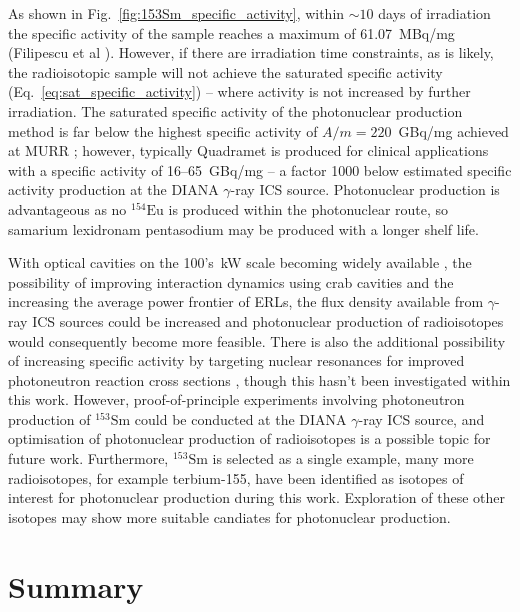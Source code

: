 \documentclass[../main.tex]{subfiles}
\begin{document}
As shown in Fig.~\ref{fig:153Sm_specific_activity}, within $\sim 10$ days of irradiation the specific activity of the sample reaches a maximum of 61.07~\si{\mega\becquerel}/\si{\milli\gram} (Filipescu et al \cite{filipescu2014photoneutron}). However, if there are irradiation time constraints, as is likely, the radioisotopic sample will not achieve the saturated specific activity (Eq.~\ref{eq:sat_specific_activity}) -- where activity is not increased by further irradiation. The saturated specific activity of the photonuclear production method is far below the highest specific activity of $A/m=220$~\si{\giga\becquerel}/\si{\milli\gram} achieved at MURR \cite{ma1996production}; however, typically Quadramet is produced for clinical applications with a specific activity of 16--65~\si{\giga\becquerel}/\si{\milli\gram} \cite{ema2015quadramet} -- a factor 1000 below estimated specific activity production at the DIANA $\gamma$-ray ICS source. Photonuclear production is advantageous as no $^{154}\mathrm{Eu}$ is produced within the photonuclear route, so samarium lexidronam pentasodium may be produced with a longer shelf life.
 
With optical cavities on the 100's~\si{\kilo\watt} scale becoming widely available \cite{eggl2016munich,liu2018optical}, the possibility of improving interaction dynamics using crab cavities \cite{variola2011luminosity,koshiba2018luminosity} and the increasing the average power frontier of ERLs, the flux density available from $\gamma$-ray ICS sources could be increased and photonuclear production of radioisotopes would consequently become more feasible. There is also the additional possibility of increasing specific activity by targeting nuclear resonances for improved photoneutron reaction cross sections \cite{habs2011production}, though this hasn't been investigated within this work. However, proof-of-principle experiments involving photoneutron production of $^{153}\mathrm{Sm}$ could be conducted at the DIANA $\gamma$-ray ICS source, and optimisation of photonuclear production of radioisotopes is a possible topic for future work. Furthermore, $^{153}\mathrm{Sm}$ is selected as a single example, many more radioisotopes, for example terbium-155, have been identified as isotopes of interest for photonuclear production during this work. Exploration of these other isotopes may show more suitable candiates for photonuclear production.      

\section{Summary}
\end{document}
